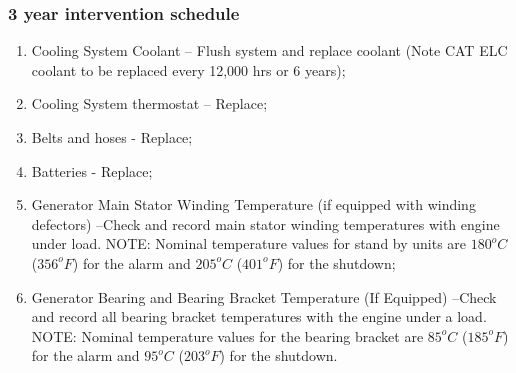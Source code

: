 \subsubsection{3 year intervention schedule}
\begin{enumerate}[label=(\alph*)]
\item Cooling System Coolant – Flush system and replace coolant (Note CAT ELC coolant to be replaced every 12,000 hrs or 6 years);
\item Cooling System thermostat – Replace;
\item Belts and hoses - Replace;
\item Batteries - Replace;
\item Generator Main Stator Winding Temperature (if equipped with winding defectors) –Check and record main stator winding temperatures with engine under load. NOTE: Nominal temperature values for stand by units are $180^{o}C$ ($356^{o}F$) for the alarm and $205^{o}C$ ($401^{o}F$) for the shutdown;
\item  Generator Bearing and Bearing Bracket Temperature (If Equipped) –Check and record all bearing bracket temperatures with the engine under a load. NOTE: Nominal temperature values for the bearing bracket are $85^{o}C$ ($185^{o}F$) for the alarm and $95^{o}C$ ($203^{o}F$) for the shutdown.
\end{enumerate}

